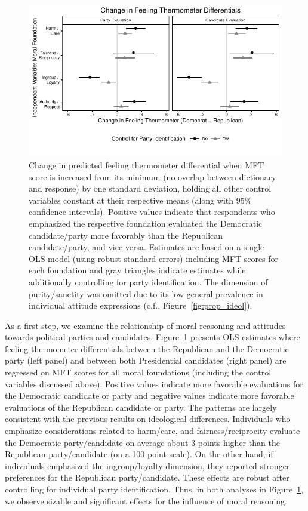 \documentclass[12pt]{article}
\begin{document}
\begin{figure}[ht]\centering
\includegraphics{../calc/fig/ols_feel.pdf}
\caption{Change in predicted feeling thermometer differential when MFT score is increased from its minimum (no overlap between dictionary and response) by one standard deviation, holding all other control variables constant at their respective means (along with 95\% confidence intervals). Positive values indicate that respondents who emphasized the respective foundation evaluated the Democratic candidate/party more favorably than the Republican candidate/party, and vice versa. Estimates are based on a single OLS model (using robust standard errors) including MFT scores for each foundation and gray triangles indicate estimates while additionally controlling for party identification. The dimension of purity/sanctity was omitted due to its low general prevalence in individual attitude expressions (c.f., Figure~\ref{fig:prop_ideol}). %
}\label{fig:ols_feel}
\end{figure}

As a first step, we examine the relationship of moral reasoning and attitudes towards political parties and candidates. Figure~\ref{fig:ols_feel} presents OLS estimates where feeling thermometer differentials between the Republican and the Democratic party (left panel) and between both Presidential candidates (right panel) are regressed on MFT scores for all moral foundations (including the control variables discussed above). Positive values indicate more favorable evaluations for the Democratic candidate or party and negative values indicate more favorable evaluations of the Republican candidate or party. The patterns are largely consistent with the previous results on ideological differences. Individuals who emphasize considerations related to harm/care, and fairness/reciprocity evaluate the Democratic party/candidate on average about 3 points higher than the Republican party/candidate (on a 100 point scale). On the other hand, if individuals emphasized the ingroup/loyalty dimension, they reported stronger preferences for the Republican party/candidate. These effects are robust after controlling for individual party identification. Thus, in both analyses in Figure~\ref{fig:ols_feel}, we observe sizable and significant effects for the influence of moral reasoning.
\end{document}
